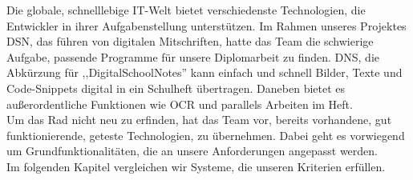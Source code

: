 
Die globale, schnelllebige IT-Welt bietet verschiedenste Technologien, die Entwickler in ihrer Aufgabenstellung unterstützen. Im Rahmen unseres Projektes DSN, das führen von digitalen Mitschriften, hatte das Team die schwierige Aufgabe, passende Programme für unsere Diplomarbeit zu finden. DNS, die Abkürzung für ,,DigitalSchoolNotes'' kann einfach und schnell Bilder, Texte und Code-Snippets digital in ein Schulheft übertragen. Daneben bietet es außerordentliche Funktionen wie OCR und parallels Arbeiten im Heft.\\
Um das Rad nicht neu zu erfinden, hat das Team vor, bereits vorhandene, gut funktionierende, geteste Technologien, zu übernehmen. Dabei geht es vorwiegend um Grundfunktionalitäten, die an unsere Anforderungen angepasst werden.\\
Im folgenden Kapitel vergleichen wir Systeme, die unseren Kriterien erfüllen.